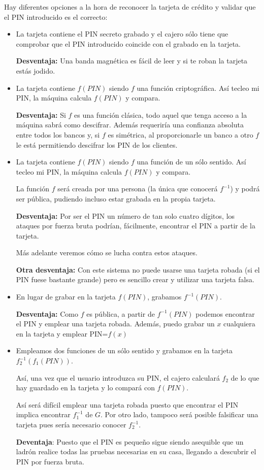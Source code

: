 Hay diferentes opciones a la hora de reconocer la tarjeta de crédito y validar que el PIN introducido es el correcto:

\begin{itemize}
\item La tarjeta contiene el PIN secreto grabado y el cajero sólo tiene que comprobar que el PIN introducido coincide con el grabado en la tarjeta.

\textbf{Desventaja:} Una banda magnética es fácil de leer y si te roban la tarjeta estás jodido.

\item La tarjeta contiene $f(PIN)$ siendo $f$ una función criptográfica. Así tecleo mi PIN, la máquina calcula $f(PIN)$ y compara.

\textbf{Desventaja:} Si $f$ es una función clásica, todo aquel que tenga acceso a la máquina sabrá como descifrar. Además requeriría una confianza absoluta entre todos los bancos y, si $f$ es simétrica, al proporcionarle un banco a otro $f$ le está permitiendo descifrar los PIN de los clientes.

\item La tarjeta contiene $f(PIN)$ siendo $f$ una función de un sólo sentido. Así tecleo mi PIN, la máquina calcula $f(PIN)$ y compara.

La función $f$ será creada por una persona (la única que conocerá $f^{-1}$) y podrá ser pública, pudiendo incluso estar grabada en la propia tarjeta.

\textbf{Desventaja:} Por ser el PIN un número de tan solo cuatro dígitos, los ataques por fuerza bruta podrían, fácilmente, encontrar el PIN a partir de la tarjeta.

Más adelante veremos cómo se lucha contra estos ataques.

\textbf{Otra desventaja:} Con este sistema no puede usarse una tarjeta robada (si el PIN fuese bastante grande) pero es sencillo crear y utilizar una tarjeta falsa.

\item En lugar de grabar en la tarjeta $f(PIN)$, grabamos $f^{-1}(PIN)$.

\textbf{Desventaja:} Como $f$ es pública, a partir de $f^{-1}(PIN)$ podemos encontrar el PIN y emplear una tarjeta robada. Además, puedo grabar un $x$ cualquiera en la tarjeta y emplear PIN=$f(x)$

\item Empleamos dos funciones de un sólo sentido y grabamos en la tarjeta $f_2^{-1}(f_1(PIN))$.

Así, una vez que el usuario introduzca su PIN, el cajero calculará $f_2$ de lo que hay guardado en la tarjeta y lo compará con $f(PIN)$.

Así será difícil emplear una tarjeta robada puesto que encontrar el PIN implica encontrar $f_1^{-1}$ de $G$. Por otro lado, tampoco será posible falsificar una tarjeta pues sería necesario conocer $f_2^{-1}$.

\textbf{Deventaja}: Puesto que el PIN es pequeño sigue siendo asequible que un ladrón realice todas las pruebas necesarias en su casa, llegando a descubrir el PIN por fuerza bruta.
\end{itemize}

